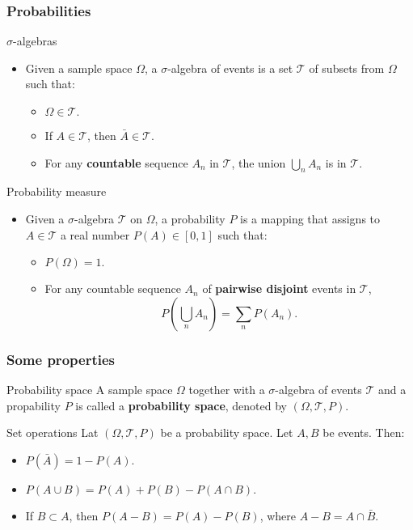 \begin{frame}
    \frametitle{Probabilities}
    \begin{block}{$\sigma$-algebras}
        \begin{itemize}
            \item<+-> Given a sample space $\Omega$, a $\sigma$-algebra of
            events is a set $\mathcal{T}$ of subsets from $\Omega$ such that:
            \begin{itemize}
                \item<+-> $\Omega \in \mathcal{T}.$
                \item<+-> If $A \in \mathcal{T}$, then $\bar{A} \in \mathcal{T}.$
                \item<+-> For any \textbf{countable} sequence $A_n$ in $\mathcal{T}$, the union
                $\bigcup_n A_n$ is in $\mathcal{T}.$
            \end{itemize}
        \end{itemize}
    \end{block}
\begin{block}{Probability measure}
    \begin{itemize}
        \item<+-> Given a $\sigma$-algebra $\mathcal{T}$ on $\Omega$, a 
        probability $P$ is a mapping that assigns to $A \in \mathcal{T}$ a real
        number $P(A) \in [0,1]$ such that:
        \begin{itemize}
        \item<+-> $P\left( \Omega \right) = 1.$
        \item<+-> For any countable sequence $A_n$ of \textbf{pairwise disjoint} events in $\mathcal{T}$,
        \begin{equation}
             \label{eq:proba_additivty}
            P\left( \bigcup_n A_n \right) = \sum_n P\left( A_n \right).
        \end{equation}
        \end{itemize}
    \end{itemize}
\end{block}
\end{frame}
\begin{frame}
    \frametitle{Some properties}
\begin{block}{Probability space}
A sample space $\Omega$ together with a $\sigma$-algebra of events $\mathcal{T}$ and
a propability $P$ is called a \textbf{probability space}, denoted by 
$\left( \Omega, \mathcal{T}, P \right).$
\end{block}
\begin{block}{Set operations}
    Lat $\left( \Omega, \mathcal{T}, P \right)$ be a probability space. 
    Let $A,B$ be events. Then:
    \begin{itemize}
        \item<+-> $P\left(\bar{A} \right) = 1 - P(A).$
        \item<+-> $P\left( A \cup B \right) = P(A) + P(B) - P\left( A \cap B \right).$
        \item<+-> If $B \subset A$, then $P\left( A - B \right) = P(A) - P(B)$, where
        $A-B = A \cap \bar{B}.$
    \end{itemize}
\end{block}
\end{frame}
